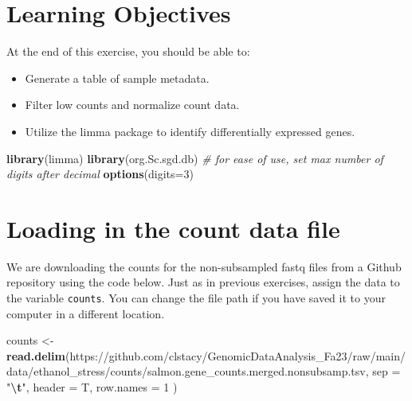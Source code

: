 \documentclass[
]{book}
\newenvironment{Shaded}{\begin{snugshade}}{\end{snugshade}}
\newcommand{\AttributeTok}[1]{\textcolor[rgb]{0.13,0.29,0.53}{#1}}
\newcommand{\CommentTok}[1]{\textcolor[rgb]{0.56,0.35,0.01}{\textit{#1}}}
\newcommand{\DecValTok}[1]{\textcolor[rgb]{0.00,0.00,0.81}{#1}}
\newcommand{\FunctionTok}[1]{\textcolor[rgb]{0.13,0.29,0.53}{\textbf{#1}}}
\newcommand{\NormalTok}[1]{#1}
\newcommand{\OtherTok}[1]{\textcolor[rgb]{0.56,0.35,0.01}{#1}}
\newcommand{\SpecialCharTok}[1]{\textcolor[rgb]{0.81,0.36,0.00}{\textbf{#1}}}
\newcommand{\StringTok}[1]{\textcolor[rgb]{0.31,0.60,0.02}{#1}}
\providecommand{\tightlist}{%
  \setlength{\itemsep}{0pt}\setlength{\parskip}{0pt}}
\begin{document}
\hypertarget{learning-objectives}{%
\section{Learning Objectives}\label{learning-objectives}}

At the end of this exercise, you should be able to:

\begin{itemize}
\tightlist
\item
  Generate a table of sample metadata.
\item
  Filter low counts and normalize count data.
\item
  Utilize the limma package to identify differentially expressed
  genes.
\end{itemize}

\begin{Shaded}
\begin{Highlighting}[]
\FunctionTok{library}\NormalTok{(limma)}
\FunctionTok{library}\NormalTok{(org.Sc.sgd.db)}
\CommentTok{\# for ease of use, set max number of digits after decimal}
\FunctionTok{options}\NormalTok{(}\AttributeTok{digits=}\DecValTok{3}\NormalTok{)}
\end{Highlighting}
\end{Shaded}

\hypertarget{loading-in-the-count-data-file}{%
\section{Loading in the count data file}\label{loading-in-the-count-data-file}}

We are downloading the counts for the non-subsampled fastq files from a
Github repository using the code below. Just as in previous exercises,
assign the data to the variable \texttt{counts}. You can change the file path
if you have saved it to your computer in a different location.

\begin{Shaded}
\begin{Highlighting}[]
\NormalTok{counts }\OtherTok{\textless{}{-}} \FunctionTok{read.delim}\NormalTok{(}\StringTok{\textquotesingle{}https://github.com/clstacy/GenomicDataAnalysis\_Fa23/raw/main/data/ethanol\_stress/counts/salmon.gene\_counts.merged.nonsubsamp.tsv\textquotesingle{}}\NormalTok{,}
    \AttributeTok{sep =} \StringTok{"}\SpecialCharTok{\textbackslash{}t}\StringTok{"}\NormalTok{,}
    \AttributeTok{header =}\NormalTok{ T,}
    \AttributeTok{row.names =} \DecValTok{1}
\NormalTok{  )}
\end{Highlighting}
\end{Shaded}
\end{document}
